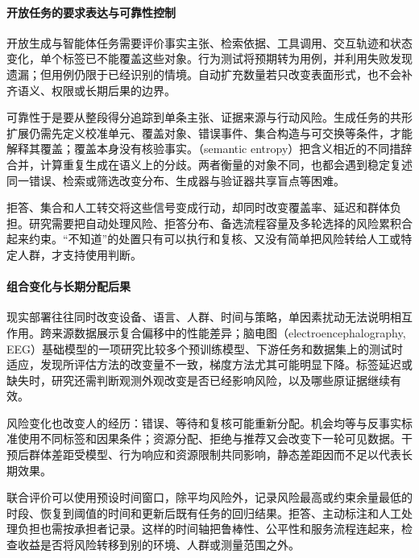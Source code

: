 \paragraph{开放任务的要求表达与可靠性控制}

开放生成与智能体任务需要评价事实主张、检索依据、工具调用、交互轨迹和状态变化，单个标签已不能覆盖这些对象。行为测试将预期转为用例，并利用失败发现遗漏；但用例仍限于已经识别的情境。自动扩充数量若只改变表面形式，也不会补齐语义、权限或长期后果的边界。

可靠性于是要从整段得分追踪到单条主张、证据来源与行动风险。生成任务的共形扩展仍需先定义校准单元、覆盖对象、错误事件、集合构造与可交换等条件，才能解释其覆盖；覆盖本身没有核验事实。（semantic entropy）把含义相近的不同措辞合并，计算重复生成在语义上的分歧。两者衡量的对象不同，也都会遇到稳定复述同一错误、检索或筛选改变分布、生成器与验证器共享盲点等困难。

拒答、集合和人工转交将这些信号变成行动，却同时改变覆盖率、延迟和群体负担。研究需要把自动处理风险、拒答分布、备选流程容量及多轮选择的风险累积合起来约束。“不知道”的处置只有可以执行和复核、又没有简单把风险转给人工或特定人群，才支持使用判断。

\paragraph{组合变化与长期分配后果}

现实部署往往同时改变设备、语言、人群、时间与策略，单因素扰动无法说明相互作用。跨来源数据展示复合偏移中的性能差异；脑电图（electroencephalography, EEG）基础模型的一项研究比较多个预训练模型、下游任务和数据集上的测试时适应，发现所评估方法的改变量不一致，梯度方法尤其可能明显下降。标签延迟或缺失时，研究还需判断观测外观改变是否已经影响风险，以及哪些原证据继续有效。

风险变化也改变人的经历：错误、等待和复核可能重新分配。机会均等与反事实标准使用不同标签和因果条件；资源分配、拒绝与推荐又会改变下一轮可见数据。干预后群体差距受模型、行为响应和资源限制共同影响，静态差距因而不足以代表长期效果。

联合评价可以使用预设时间窗口，除平均风险外，记录风险最高或约束余量最低的时段、恢复到阈值的时间和更新后既有任务的回归结果。拒答、主动标注和人工处理负担也需按承担者记录。这样的时间轴把鲁棒性、公平性和服务流程连起来，检查收益是否将风险转移到别的环境、人群或测量范围之外。

